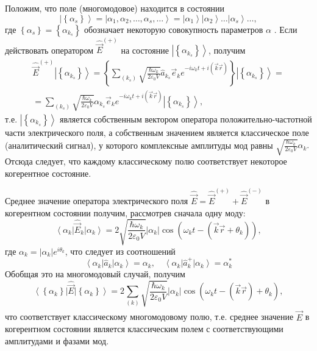 Положим, что поле (многомодовое) находится в состоянии
\[
\left| \left\{\alpha_s\right\}\right> = 
\left| \alpha_1, \alpha_2, \dots, \alpha_s, \dots\right> = 
\left| \alpha_1\right> \left| \alpha_2\right> \dots \left| \alpha_s\right> \dots,
\]
где $\left\{\alpha_s\right\}= \left\{\alpha_{k_s}\right\}$
обозначает некоторую совокупность параметров $\alpha$ . Если действовать
оператором $\hat{\vec{E}}^{(+)}$ на состояние  $\left|\left\{\alpha_{k_s}\right\}\right>$,  получим 
\begin{eqnarray}
\hat{\vec{E}}^{(+)}\left|\left\{\alpha_{k_s}\right\}\right> = 
\left\{ \sum_{(k_s)} \sqrt{\frac{\hbar \omega_k}{2 \varepsilon_0
V}} \hat{a}_{k_s} \vec{e}_k e^{-i \omega_k t + i \left(\vec{k}\vec{r}
  \right)}\right\}\left|\left\{\alpha_{k_s}\right\}\right> = 
\nonumber \\
= 
\sum_{(k_s)} \sqrt{\frac{\hbar \omega_k}{2 \varepsilon_0
V}} \alpha_{k_s} \vec{e}_k e^{-i \omega_k t + i \left(\vec{k}\vec{r}
  \right)}\left|\left\{\alpha_{k_s}\right\}\right>,
\end{eqnarray}
т.е. $\left|\left\{\alpha_{k_s}\right\}\right>$  является собственным
вектором оператора положительно-частотной части электрического поля, а
собственным значением является классическое поле (аналитический
сигнал), у которого комплексные амплитуды мод равны  
\(
\sqrt{\frac{\hbar \omega_k}{2 \varepsilon_0
V}} \alpha_k.
\)
Отсюда следует, что каждому классическому полю соответствует некоторое
когерентное состояние. 

Среднее значение оператора электрического поля $\hat{\vec{E}} =
\hat{\vec{E}}^{(+)} + \hat{\vec{E}}^{(-)}$   в когерентном
состоянии получим, рассмотрев сначала одну моду: 
\[
\left<\alpha_{k}\right|\hat{\vec{E}}_k\left|\alpha_{k}\right> = 2
\sqrt{\frac{\hbar \omega_k}{2 \varepsilon_0
V}}\left|\alpha_{k}\right|\cos 
\left(\omega_k t - \left(\vec{k} \vec{r} + \theta_k\right) \right),
\]
где $\alpha_k = \left|\alpha_{k}\right| e^{i \theta_k}$, что следует из соотношений
\[
\left<\alpha_k\right|\hat{a}_k\left|\alpha_k\right> = \alpha_k, \quad
\left<\alpha_k\right|\hat{a}^{+}_k\left|\alpha_k\right> = \alpha^{*}_k
\]
Обобщая это на многомодовый случай, получим
\begin{equation}
\left<\left\{\alpha_{k}\right\}\right|\hat{\vec{E}}\left|\left\{\alpha_{k}\right\}\right>
= 2 \sum_{(k)} \sqrt{\frac{\hbar \omega_k}{2 \varepsilon_0
V}} \left|\alpha_k\right|\cos \left(\omega_k t -
\left(\vec{k}\vec{r}\right) + \theta_k \right),
\end{equation}
что соответствует классическому многомодовому полю, т.е. среднее
значение $\hat{\vec{E}}$   в когерентном состоянии является
классическим полем с соответствующими амплитудами и фазами мод. 

